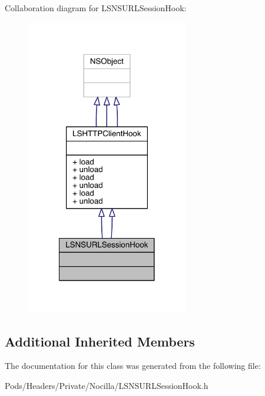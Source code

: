 Collaboration diagram for L\-S\-N\-S\-U\-R\-L\-Session\-Hook\-:\nopagebreak
\begin{figure}[H]
\begin{center}
\leavevmode
\includegraphics[width=200pt]{interface_l_s_n_s_u_r_l_session_hook__coll__graph}
\end{center}
\end{figure}
\subsection*{Additional Inherited Members}


The documentation for this class was generated from the following file\-:\begin{DoxyCompactItemize}
\item 
Pods/\-Headers/\-Private/\-Nocilla/L\-S\-N\-S\-U\-R\-L\-Session\-Hook.\-h\end{DoxyCompactItemize}
